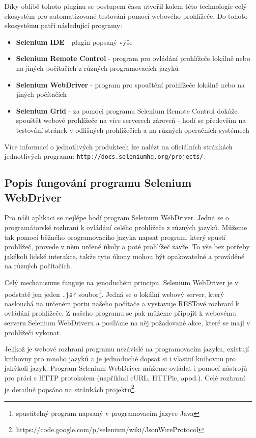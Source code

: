 \documentclass[thesis=M,czech]{FITthesis}[2013/05/10]
\begin{document}
Díky oblibě tohoto pluginu se postupem času utvořil kolem této technologie celý ekosystém pro automatizované testování pomocí webového prohlížeče. Do tohoto ekosystému patří následující programy:

\begin{itemize}
  \item \textbf{Selenium IDE} - plugin popsaný výše
  \item \textbf{Selenium Remote Control} - program pro ovládání prohlížeče lokálně nebo na jiných počítačích z různých programovacích jazyků
  \item \textbf{Selenium WebDriver} - program pro spouštění prohlížeče lokálně nebo na jiných počítačích
  \item \textbf{Selenium Grid} - za pomoci programu Selenium Remote Control dokáže spouštět webové prohlížeče na více serverech zároveň - hodí se především na testování stránek v odlišných prohlížečích a na různých operačních systémech
\end{itemize}

Více informací o jednotlivých produktech lze nalézt na oficiálních stránkách jednotlivých programů: \verb|http://docs.seleniumhq.org/projects/|. 

\subsection{Popis fungování programu Selenium WebDriver}

Pro náši aplikaci se nejlépe hodí program Seleinum WebDriver. Jedná se o programátorské rozhraní k ovládání celého prohlížeče z různých jazyků. Můžeme tak pomocí běžného programovacího jazyka napsat program, který spustí prohlížeč, provede v něm určené úkoly a poté prohlížeč zavře. To vše bez potřeby jakékoli lidské interakce, takže tyto úkony mohou být opakovatelné a prováděné na různých počítačích.

Celý mechanismus funguje na jenoduchém principu. Selenium WebDriver je v podstatě jen jeden \verb|.jar| soubor\footnote{spustitelný program napsaný v programovacím jazyce Java}. Jedná se o lokální webový server, který naslouchá na určeném portu našeho počítače a vystavuje RESTové rozhraní k ovládání prohlížeče. Z našeho programu se pak můžeme připojit k webovému serveru Selenium WebDriveru a posíláme na něj požadované akce, které se mají v prohlížeči vykonat. 

Jelikož je webové rozhraní programu nezávislé na programovacím jazyku, existují knihovny pro mnoho jazyků a je jednoduché dopsat si i vlastní knihovnu pro jakýkoli jazyk. Program Selenium WebDriver můžeme ovládat i pomocí nástrojů pro práci s HTTP protokolem (například cURL, HTTPie, apod.). Celé rozhraní je detailně popsáno na stránkách projektu\footnote{https://code.google.com/p/selenium/wiki/JsonWireProtocol}.
\end{document}
